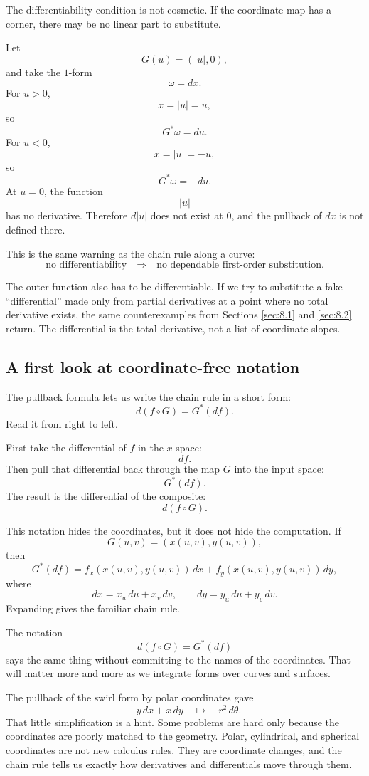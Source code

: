 The differentiability condition is not cosmetic.  If the coordinate map has a corner,
there may be no linear part to substitute.

Let
\[
    G(u)=(|u|,0),
\]
and take the \(1\)-form
\[
    \omega=dx.
\]
For \(u>0\),
\[
    x=|u|=u,
\]
so
\[
    G^*\omega=du.
\]
For \(u<0\),
\[
    x=|u|=-u,
\]
so
\[
    G^*\omega=-du.
\]
At \(u=0\), the function
\[
    |u|
\]
has no derivative.  Therefore \(d|u|\) does not exist at \(0\), and the pullback of
\(dx\) is not defined there.

This is the same warning as the chain rule along a curve:
\[
    \text{no differentiability}
    \quad\Longrightarrow\quad
    \text{no dependable first-order substitution.}
\]

The outer function also has to be differentiable.  If we try to substitute a fake
``differential'' made only from partial derivatives at a point where no total derivative
exists, the same counterexamples from Sections \ref{sec:8.1} and \ref{sec:8.2} return.
The differential is the total derivative, not a list of coordinate slopes.

\subsection{A first look at coordinate-free notation}

The pullback formula lets us write the chain rule in a short form:
\[
\boxed{
    d(f\circ G)=G^*(df).
}
\]
Read it from right to left.

First take the differential of \(f\) in the \(x\)-space:
\[
    df.
\]
Then pull that differential back through the map \(G\) into the input space:
\[
    G^*(df).
\]
The result is the differential of the composite:
\[
    d(f\circ G).
\]

This notation hides the coordinates, but it does not hide the computation.  If
\[
    G(u,v)=(x(u,v),y(u,v)),
\]
then
\[
    G^*(df)
    =
    f_x(x(u,v),y(u,v))\,dx
    +
    f_y(x(u,v),y(u,v))\,dy,
\]
where
\[
    dx=x_u\,du+x_v\,dv,
    \qquad
    dy=y_u\,du+y_v\,dv.
\]
Expanding gives the familiar chain rule.

The notation
\[
    d(f\circ G)=G^*(df)
\]
says the same thing without committing to the names of the coordinates.  That will
matter more and more as we integrate forms over curves and surfaces.

The pullback of the swirl form by polar coordinates gave
\[
    -y\,dx+x\,dy
    \quad\longmapsto\quad
    r^2\,d\theta.
\]
That little simplification is a hint.  Some problems are hard only because the coordinates
are poorly matched to the geometry.  Polar, cylindrical, and spherical coordinates are
not new calculus rules.  They are coordinate changes, and the chain rule tells us exactly
how derivatives and differentials move through them.

